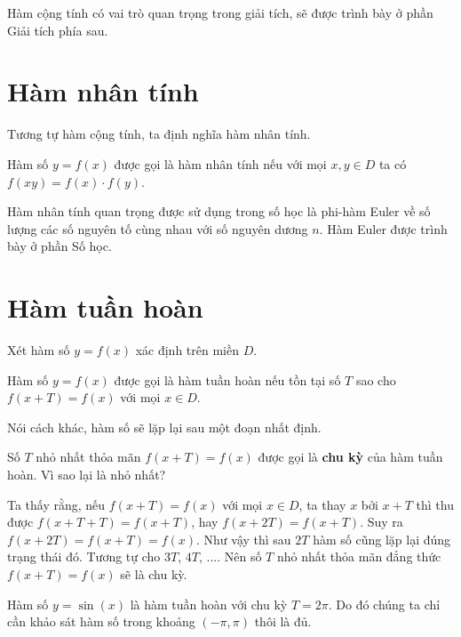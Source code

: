 Hàm cộng tính có vai trò quan trọng trong giải tích, sẽ được trình bày
ở phần Giải tích phía sau.

\section{Hàm nhân tính}

Tương tự hàm cộng tính, ta định nghĩa hàm nhân tính.

\begin{definition}
    Hàm số $y = f(x)$ được gọi là hàm nhân tính nếu với mọi $x, y \in D$
    ta có $f(xy) = f(x) \cdot f(y)$.
\end{definition}

Hàm nhân tính quan trọng được sử dụng trong số học là phi-hàm Euler
về số lượng các số nguyên tố cùng nhau với số nguyên dương $n$. Hàm
Euler được trình bày ở phần Số học.

\section{Hàm tuần hoàn}

Xét hàm số $y=f(x)$ xác định trên miền $D$.

\begin{definition}
    Hàm số $y=f(x)$ được gọi là hàm tuần hoàn nếu tồn tại số $T$
    sao cho $f(x+T) = f(x)$ với mọi $x \in D$.
\end{definition}

Nói cách khác, hàm số sẽ lặp lại sau một đoạn nhất định.

Số $T$ nhỏ nhất thỏa mãn $f(x+T) = f(x)$ được gọi là \textbf{chu kỳ}
của hàm tuần hoàn. Vì sao lại là nhỏ nhất?

Ta thấy rằng, nếu $f(x+T) = f(x)$ với mọi $x \in D$, ta thay $x$ bởi
$x + T$ thì thu được $f(x + T + T) = f(x+T)$, hay $f(x+2T) = f(x+T)$.
Suy ra $f(x+2T) = f(x+T) = f(x)$. Như vậy thì sau $2T$ hàm số cũng
lặp lại đúng trạng thái đó. Tương tự cho $3T$, $4T$, .... Nên số $T$
nhỏ nhất thỏa mãn đẳng thức $f(x+T) = f(x)$ sẽ là chu kỳ.

\begin{example}
    Hàm số $y = \sin(x)$ là hàm tuần hoàn với chu kỳ $T = 2\pi$.
    Do đó chúng ta chỉ cần khảo sát hàm số trong khoảng $(-\pi, \pi)$
    thôi là đủ.
\end{example}